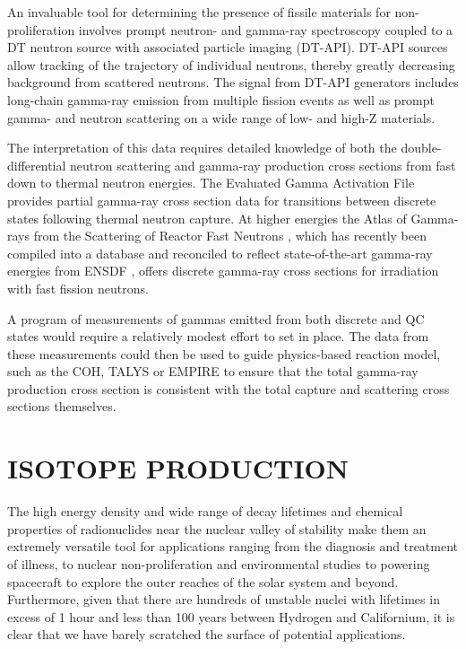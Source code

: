 \documentclass[letterpaper,draft]{ar-1col}
\begin{document}
An invaluable tool for determining the presence of fissile materials for non-proliferation involves prompt neutron- and gamma-ray spectroscopy coupled to a DT neutron source with associated particle imaging (DT-API).   DT-API sources allow tracking of the trajectory of individual neutrons, thereby greatly decreasing background from scattered neutrons.  The signal from DT-API generators includes long-chain gamma-ray emission from multiple fission events \cite{Pra12,Nak10} as well as prompt gamma- and neutron scattering on a wide range of low- and high-Z materials.   

The interpretation of this data requires detailed knowledge of both the double-differential neutron scattering and gamma-ray production cross sections from fast down to thermal neutron energies.  The Evaluated Gamma Activation File \cite{Fir14} provides partial gamma-ray cross section data for transitions between discrete states following thermal neutron capture.  At higher energies the Atlas of Gamma-rays from the Scattering of Reactor Fast Neutrons \cite{Dem78}, which has recently been compiled into a database and reconciled to reflect state-of-the-art gamma-ray energies from ENSDF \cite{Hur18}, offers discrete gamma-ray cross sections for irradiation with fast fission neutrons.  

A program of measurements of gammas emitted from both discrete and QC states would require a relatively modest effort to set in place.  The data from these measurements could then be used to guide physics-based reaction model, such as the COH, TALYS or EMPIRE to ensure that the total gamma-ray production cross section is consistent with the total capture and scattering cross sections themselves. 


\section{ISOTOPE PRODUCTION}\label{sec:isotope_production}


The high energy density and wide range of decay lifetimes and chemical properties of radionuclides near the nuclear valley of stability make them an extremely versatile tool for applications ranging from the diagnosis and treatment of illness, to nuclear non-proliferation and environmental studies to powering spacecraft to explore the outer reaches of the solar system and beyond. Furthermore, given that there are hundreds of unstable nuclei with lifetimes in excess of 1 hour and less than 100 years between Hydrogen and Californium, it is clear that we have barely scratched the surface of potential applications.
\end{document}
